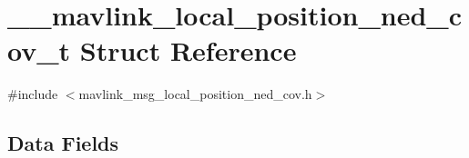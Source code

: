 \hypertarget{struct____mavlink__local__position__ned__cov__t}{\section{\+\_\+\+\_\+mavlink\+\_\+local\+\_\+position\+\_\+ned\+\_\+cov\+\_\+t Struct Reference}
\label{struct____mavlink__local__position__ned__cov__t}
}


{\ttfamily \#include $<$mavlink\+\_\+msg\+\_\+local\+\_\+position\+\_\+ned\+\_\+cov.\+h$>$}

\subsection*{Data Fields}
